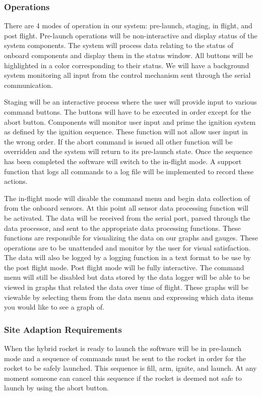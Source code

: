 \documentclass[10pt,draftclsnofoot,onecolumn,compsoc]{IEEEtran}
\begin{document}
\subsubsection {Operations}
There are 4 modes of operation in our system: pre-launch, staging, in flight, and post flight.  Pre-launch operations will be non-interactive and display status of the system components. The system will process data relating to the status of onboard components and display them in the status window. All buttons will be highlighted in a color corresponding to their status. We will have a background system monitoring all input from the control mechanism sent through the serial communication. \par
	Staging will be an interactive process where the user will provide input to various command buttons. The buttons will have to be executed in order except for the abort button. Components will monitor user input and prime the ignition system as defined by the ignition sequence. These function will not allow user input in the wrong order. If the abort command is issued all other function will be overridden and the system will return to its pre-launch state. Once the sequence has been completed the software will switch to the in-flight mode. A support function that logs all commands to a log file will be implemented to record these actions.\par
	The in-flight mode will disable the command menu and begin data collection of from the onboard sensors. At this point all sensor data processing function will be activated. The data will be received from the serial port, parsed through the data processor, and sent to the appropriate data processing functions. These functions are responsible for visualizing the data on our graphs and gauges. These operations are to be unattended and monitor by the user for visual satisfaction.  The data will also be logged by a logging function in a text format to be use by the post flight mode.
	Post flight mode will be fully interactive. The command menu will still be disabled but data stored by the data logger will be able to be viewed in graphs that related the data over time of flight. These graphs will be viewable by selecting them from the data menu and expressing which data items you would like to see a graph of. \par

\subsubsection{Site Adaption Requirements}
When the hybrid rocket is ready to launch the software will be in pre-launch mode and a sequence of commands must be sent to the rocket in order for the rocket to be safely launched. This sequence is fill, arm, ignite, and launch. At any moment someone can cancel this sequence if the rocket is deemed not safe to launch by using the abort button.
\end{document}
